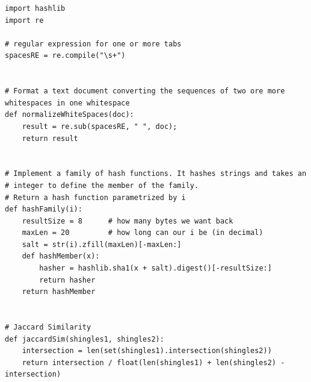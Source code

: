 \documentclass{article}
\begin{document}
\begin{lstlisting}
import hashlib
import re

# regular expression for one or more tabs
spacesRE = re.compile("\s+")


# Format a text document converting the sequences of two ore more whitespaces in one whitespace
def normalizeWhiteSpaces(doc):
    result = re.sub(spacesRE, " ", doc);
    return result


# Implement a family of hash functions. It hashes strings and takes an # integer to define the member of the family.
# Return a hash function parametrized by i
def hashFamily(i):
    resultSize = 8      # how many bytes we want back
    maxLen = 20         # how long can our i be (in decimal)
    salt = str(i).zfill(maxLen)[-maxLen:]
    def hashMember(x):
        hasher = hashlib.sha1(x + salt).digest()[-resultSize:]
        return hasher
    return hashMember


# Jaccard Similarity
def jaccardSim(shingles1, shingles2):
    intersection = len(set(shingles1).intersection(shingles2))
    return intersection / float(len(shingles1) + len(shingles2) - intersection)
\end{lstlisting}
\end{document}
